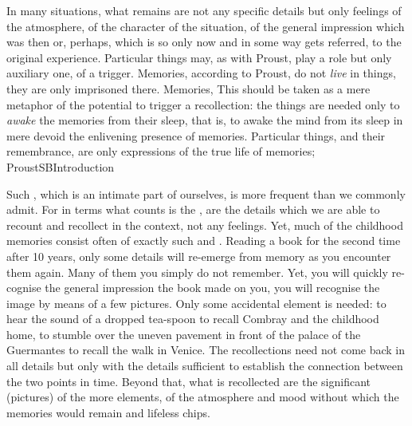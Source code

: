 In many situations, what remains are not any specific details but only
 feelings of the atmosphere, of the character of the situation, of the
general impression which was  then or, perhaps, which is so only now
and in some way gets referred,  to the original experience.
Particular things may, as with Proust, play a role but only auxiliary one, of a
trigger. Memories, according to Proust, do not {\em live} in things, they are
only imprisoned there. Memories,  This
 should be taken as a mere metaphor of the potential to
trigger a recollection: the  things are needed only to {\em awake}
the memories from their sleep, that is, to awake the mind from its sleep in mere
 devoid the enlivening presence of memories.  Particular things,
and their remembrance, are only expressions of the true life of memories;
 \citet{Compared to this past which is an intimate part of
  ourselves, the truths of intelligence seem little
  real.}{ProustSB}{Introduction} 

Such , which is an intimate part of ourselves, is more
frequent than we commonly admit. For in  terms what counts is the
, are the  details which we are able to
recount and recollect in the  context, not any  
 feelings.  Yet, much of the childhood memories consist often of exactly
such  and .  Reading a book for the second time after
10 years, only some details will re-emerge from memory as you encounter them
again.  Many of them you simply do not remember.  Yet, you will quickly
re-cognise the general impression the book made on you, you will recognise the
image by means of a few pictures.  Only some accidental
 element is needed: to hear the sound of a dropped tea-spoon to
recall Combray and the childhood home, to stumble over the uneven pavement in
front of the palace of the Guermantes to recall the walk in Venice.
The recollections need not come back in all details but only with the details
sufficient to establish the connection between the two points in time.  Beyond
that, what is recollected are the significant  (pictures) of the more
 elements, of the atmosphere and mood without which the memories
would remain  and lifeless chips.

